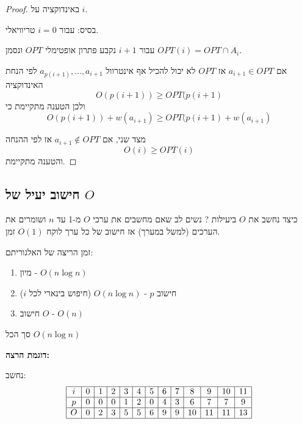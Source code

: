 \begin{proof}
באינדוקציה על $i$.

בסיס: עבור 
$i = 0$
טריוויאלי.

עבור 
$i + 1$
נקבע פתרון אופטימלי $OPT$ ונסמן
$OPT(i) = OPT \cap A_i$. 

אם
$a_{i+1} \in OPT$
אז $OPT$ לא יכול להכיל אף אינטרוול
$a_{p(i+1)}, \ldots, a_{i+1}$
לפי הנחת האינדוקציה
$$O(p(i + 1)) \geq OPT(p(i + 1)$$
ולכן הטענה מתקיימת כי
$$O(p(i + 1)) + w(a_{i+1}) \geq OPT(p(i + 1) + w(a_{i+1})$$

מצד שני, אם 
$a_{i+1} \notin OPT$
אז לפי ההנחה 
$$O(i) \geq OPT(i)$$
והטענה מתקיימת.
\end{proof}

\subsection*{חישוב יעיל של $O$}
כיצד נחשב את $O$ ביעילות ?
נשים לב שאם מחשבים את ערכי $O$ מ-1 עד $n$ ושומרים את הערכים (למשל במערך) אז חישוב של 
כל ערך לוקח 
$O(1)$
זמן.

זמן הריצה של האלגוריתם:
\begin{enumerate}
\item
מיון - 
$O(n\log n)$
\item
חישוב $p$ - 
$O(n\log n)$
(חיפוש בינארי לכל $i$)
\item
חישוב $O$ -
$O(n)$
\end{enumerate}

סך הכל 
$O(n\log n)$

\textbf{דוגמת הרצה:}
\begin{center}
\end{center}

נחשב:
$$
\begin{array}{|c|c|c|c|c|c|c|c|c|c|c|c|c|}
\hline
i & 0 & 1 & 2 & 3 & 4 & 5 & 6 & 7 & 8 & 9 & 10 & 11
\\\hline
p & 0 & 0 & 0 & 1 & 2 & 0 & 4 & 3 & 6 & 7 & 7 & 9
\\\hline
O & 0 & 2 & 3 & 5 & 5 & 6 & 9 & 9 & 10 & 11 & 11 & 13
\\\hline
\end{array}
$$


